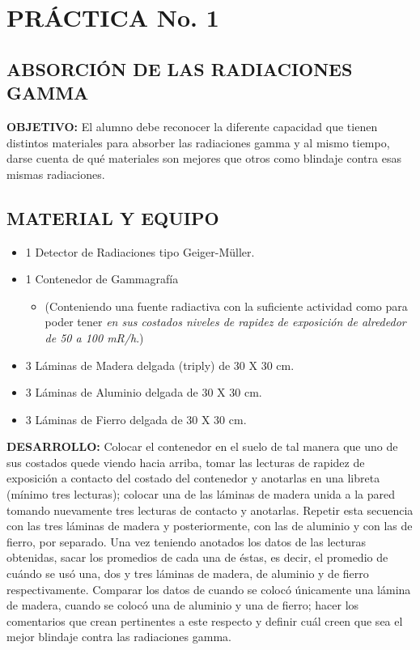 \section{PRÁCTICA No. 1}

\subsection*{ABSORCIÓN DE LAS RADIACIONES GAMMA}

\textbf{OBJETIVO:} El alumno debe reconocer la diferente capacidad que tienen distintos materiales para absorber las radiaciones gamma y al mismo tiempo, darse cuenta de qué materiales son mejores que otros como blindaje contra esas mismas radiaciones.

\subsection*{MATERIAL Y EQUIPO}
\begin{itemize}
    \item 1 Detector de Radiaciones tipo Geiger-Müller.
    \item 1 Contenedor de Gammagrafía 
    \begin{itemize}
        \item[] (Conteniendo una fuente radiactiva con la suficiente actividad como para poder tener \textit{en sus costados niveles de rapidez de exposición de alrededor de 50 a 100 mR/h}.)
    \end{itemize}
    \item 3 Láminas de Madera delgada (triply) de 30 X 30 cm.
    \item 3 Láminas de Aluminio delgada de 30 X 30 cm.
    \item 3 Láminas de Fierro delgada de 30 X 30 cm.
\end{itemize}

\textbf{DESARROLLO:} Colocar el contenedor en el suelo de tal manera que uno de sus costados quede viendo hacia arriba, tomar las lecturas de rapidez de exposición a contacto del costado del contenedor y anotarlas en una libreta (mínimo tres lecturas); colocar una de las láminas de madera unida a la pared tomando nuevamente tres lecturas de contacto y anotarlas. Repetir esta secuencia con las tres láminas de madera y posteriormente, con las de aluminio y con las de fierro, por separado. Una vez teniendo anotados los datos de las lecturas obtenidas, sacar los promedios de cada una de éstas, es decir, el promedio de cuándo se usó una, dos y tres láminas de madera, de aluminio y de fierro respectivamente. Comparar los datos de cuando se colocó únicamente una lámina de madera, cuando se colocó una de aluminio y una de fierro; hacer los comentarios que crean pertinentes a este respecto y definir cuál creen que sea el mejor blindaje contra las radiaciones gamma.